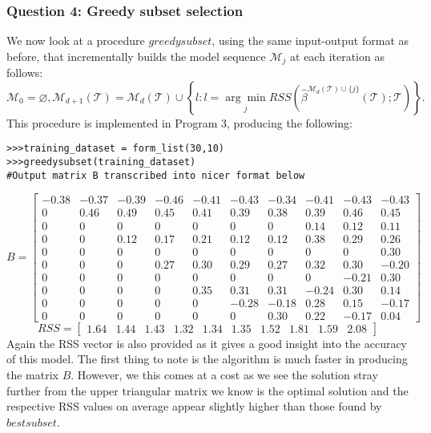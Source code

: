 \documentclass{article}
\begin{document}
\subsubsection{Question 4: Greedy subset selection}

We now look at a procedure $\textit{greedysubset}$, using the same input-output format as before, that incrementally builds the model sequence $\mathcal{M}_j$ at each iteration as follows:
\begin{equation*}
\mathcal{M}_0 = \varnothing , \mathcal{M}_{d+1}(\mathcal{T}) = \mathcal{M}_d (\mathcal{T}) \cup \left \{ l : l= \underset{j}{\arg \min} RSS \left (\hat{\beta}^{\mathcal{M}_d(\mathcal{T}) \cup \{ j \} } (\mathcal{T});\mathcal{T} \right) \right \}.
\end{equation*}
This procedure is implemented in Program 3, producing the following:

\begin{lstlisting}
>>>training_dataset = form_list(30,10) 
>>>greedysubset(training_dataset)
#Output matrix B transcribed into nicer format below
\end{lstlisting}

\begin{equation*}
B= 
\begin{bmatrix}
-0.38 & -0.37 & -0.39 & -0.46 & -0.41 & -0.43 & -0.34 & -0.41 & -0.43 & -0.43 \\
0 & 0.46 & 0.49 & 0.45 & 0.41 & 0.39 & 0.38 & 0.39 & 0.46 & 0.45 \\
0 & 0 & 0 & 0 & 0 & 0 & 0 & 0.14 & 0.12 & 0.11 \\
0 & 0 & 0.12 & 0.17 & 0.21 & 0.12 & 0.12 & 0.38 & 0.29 & 0.26 \\
0 & 0 & 0 & 0 & 0 & 0 & 0 & 0 & 0 & 0.30 \\
0 & 0 & 0 & 0.27 & 0.30 & 0.29 & 0.27 & 0.32 & 0.30 & -0.20 \\
0 & 0 & 0 & 0 & 0 & 0 & 0 & 0 & -0.21 & 0.30 \\
0 & 0 & 0 & 0 & 0.35 & 0.31 & 0.31 & -0.24 & 0.30 & 0.14 \\
0 & 0 & 0 & 0 & 0 & -0.28 & -0.18 & 0.28 & 0.15 & -0.17 \\
0 & 0 & 0 & 0 & 0 & 0 & 0.30 & 0.22 & -0.17 & 0.04
\end{bmatrix} 
\end{equation*}
\begin{equation*}
RSS = 
\begin{bmatrix}
1.64 & 1.44 & 1.43 & 1.32 & 1.34 & 1.35 & 1.52 & 1.81 & 1.59 & 2.08
\end{bmatrix} 
\end{equation*}
Again the RSS vector is also provided as it gives a good insight into the accuracy of this model. The first thing to note is the algorithm is much faster in producing the matrix $B$. However, we this comes at a cost as we see the solution stray further from the upper triangular matrix we know is the optimal solution and the respective RSS values on average appear slightly higher than those found by $\textit{bestsubset}$. 
\end{document}
